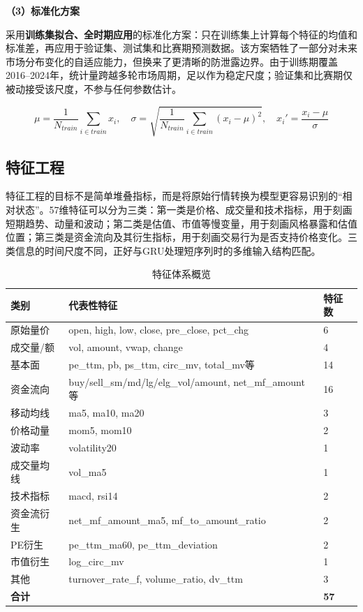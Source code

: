 \documentclass[10pt,a4paper]{ctexart}
\begin{document}
\textbf{（3）标准化方案}

采用\textbf{训练集拟合、全时期应用}的标准化方案：只在训练集上计算每个特征的均值和标准差，再应用于验证集、测试集和比赛期预测数据。该方案牺牲了一部分对未来市场分布变化的自适应能力，但换来了更清晰的防泄露边界。由于训练期覆盖2016--2024年，统计量跨越多轮市场周期，足以作为稳定尺度；验证集和比赛期仅被动接受该尺度，不参与任何参数估计。

$$ \mu = \frac{1}{N_{train}}\sum_{i \in train} x_i, \quad \sigma = \sqrt{\frac{1}{N_{train}}\sum_{i \in train}(x_i - \mu)^2}, \quad x_i' = \frac{x_i - \mu}{\sigma} $$

\subsection{特征工程}

特征工程的目标不是简单堆叠指标，而是将原始行情转换为模型更容易识别的“相对状态”。57维特征可以分为三类：第一类是价格、成交量和技术指标，用于刻画短期趋势、动量和波动；第二类是估值、市值等慢变量，用于刻画风格暴露和估值位置；第三类是资金流向及其衍生指标，用于刻画交易行为是否支持价格变化。三类信息的时间尺度不同，正好与GRU处理短序列时的多维输入结构匹配。

\begin{table}[htbp]
    \centering
    \caption{特征体系概览}
    \footnotesize
    \begin{tabular}{lll}
        \toprule
        类别 & 代表性特征 & 特征数 \\
        \midrule
        原始量价 & open, high, low, close, pre\_close, pct\_chg & 6 \\
        成交量/额 & vol, amount, vwap, change & 4 \\
        基本面 & pe\_ttm, pb, ps\_ttm, circ\_mv, total\_mv等 & 14 \\
        资金流向 & buy/sell\_sm/md/lg/elg\_vol/amount, net\_mf\_amount等 & 16 \\
        移动均线 & ma5, ma10, ma20 & 3 \\
        价格动量 & mom5, mom10 & 2 \\
        波动率 & volatility20 & 1 \\
        成交量均线 & vol\_ma5 & 1 \\
        技术指标 & macd, rsi14 & 2 \\
        资金流衍生 & net\_mf\_amount\_ma5, mf\_to\_amount\_ratio & 2 \\
        PE衍生 & pe\_ttm\_ma60, pe\_ttm\_deviation & 2 \\
        市值衍生 & log\_circ\_mv & 1 \\
        其他 & turnover\_rate\_f, volume\_ratio, dv\_ttm & 3 \\
        \midrule
        \textbf{合计} & & \textbf{57} \\
        \bottomrule
    \end{tabular}
\end{table}
\end{document}
